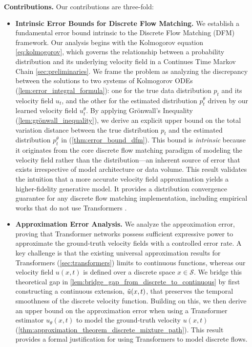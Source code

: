 \documentclass[12pt]{article}
\numberwithin{equation}{section}
\let\cite\citep
\theoremstyle{theoremstyle}
\numberwithin{equation}{section}
\numberwithin{theorem}{section}
\numberwithin{proposition}{section}
\numberwithin{definition}{section}
\numberwithin{lemma}{section}
\numberwithin{assumption}{section}
\numberwithin{remark}{section}
\begin{document}
\textbf{Contributions.} Our contributions are three-fold:
\begin{itemize}
    \item \textbf{Intrinsic Error Bounds for Discrete Flow Matching.}
    We establish a fundamental error bound intrinsic to the Discrete Flow Matching (DFM) framework. 
    Our analysis begins with the Kolmogorov equation \eqref{eq:kolmogorov}, which governs the relationship between a probability distribution and its underlying velocity field in a Continues Time Markov Chain \cref{sec:preliminaries}. 
    We frame the problem as analyzing the discrepancy between the solutions to two systems of Kolmogorov ODEs (\cref{lem:error_integral_formula}): one for the true data distribution $p_t$ and its velocity field $u_t$, and the other for the estimated distribution $p_t^\theta$ driven by our learned velocity field $u_t^\theta$. 
    By applying Grönwall’s Inequality (\cref{lem:grönwall_inequality}), we derive an explicit upper bound on the total variation distance between the true distribution $p_t$ and the estimated distribution $p_t^\theta$ in (\cref{thm:error_bound_dfm}). 
    This bound is \textit{intrinsic} because it originates from the core discrete flow matching paradigm of modeling the velocity field rather than the distribution—an inherent source of error that exists irrespective of model architecture or data volume. 
    This result validates the intuition that a more accurate velocity field approximation yields a higher-fidelity generative model.
    It provides a distribution convergence guarantee for any discrete flow matching implementation, including empirical works that do not use Transformers \cite{campbell2024generative,gat2024discrete,lipman2024flow}.
    
    \item \textbf{Approximation Error Analysis.}
    We analyze the approximation error, proving that Transformer networks possess sufficient expressive power to approximate the ground-truth velocity fields with a controlled error rate. 
    A key challenge is that the existing universal approximation results for Transformers (\cref{sec:transformers}) limits to continuous functions, whereas our velocity field $u(x,t)$ is defined over a discrete space $x \in \mathcal{S}$. 
    We bridge this theoretical gap in \cref{lem:bridge_gap_from_discrete_to_continuous} by first constructing a continuous extension, $\Tilde{u}(x,t)$, that preserves the temporal smoothness of the discrete velocity function. 
    Building on this, we then derive an upper bound on the approximation error when using a Transformer estimator $u_\theta(x,t)$ to model the ground-truth velocity $u(x,t)$ (\cref{thm:approximation_theorem_discrete_mixture_path}). 
    This result provides a formal justification for using Transformers to model discrete flows.
    

\end{itemize}
\end{document}
